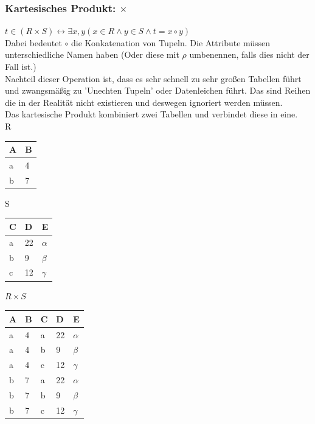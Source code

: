 \documentclass{article}
\begin{document}
 	\subsubsection{Kartesisches Produkt: \texorpdfstring{$\times$}{}}
 	$t\in (R \times S) \leftrightarrow \exists x,y (x\in R \land y \in S \land t = x\circ y)$ \\
 	Dabei bedeutet $\circ$ die Konkatenation von Tupeln. Die Attribute müssen unterschiedliche Namen haben (Oder diese mit $\rho$ umbenennen, falls dies nicht der Fall ist.) \\
 	Nachteil dieser Operation ist, dass es sehr schnell zu sehr großen Tabellen führt und zwangsmäßig zu 'Unechten Tupeln' oder Datenleichen führt. Das sind Reihen die in der Realität nicht existieren und deswegen ignoriert werden müssen. \\
 	Das kartesische Produkt kombiniert zwei Tabellen und verbindet diese in eine. \\
 	R
 	\begin{tabular}{| l | l |}
 		\toprule
 		A & B  \\ \midrule
 		a & 4  \\
 		b & 7 \\
 		\bottomrule
 \end{tabular} \hspace{0.5cm}
 S
 \begin{tabular}{| l | l | l |}
 		\toprule
 		C & D & E  \\ \midrule
 		a & 22 & $\alpha$  \\
 		b & 9 & $\beta$ \\
 		c & 12 & $\gamma$ \\
 		\bottomrule
 \end{tabular} \hspace{0.5cm}
	$R \times S$
 	 \begin{tabular}{| l | l | l | l | l |}
 		\toprule
 		A & B & C & D & E  \\ \midrule
 		a & 4 & a & 22 & $\alpha$  \\
 		a & 4 & b & 9 & $\beta$ \\
 		a & 4 & c & 12 & $\gamma$ \\
 		b & 7 & a & 22 & $\alpha$ \\
 		b & 7 & b & 9 & $\beta$ \\
 		b & 7 & c & 12 & $\gamma$ \\
 		\bottomrule
 	\end{tabular}
\end{document}
